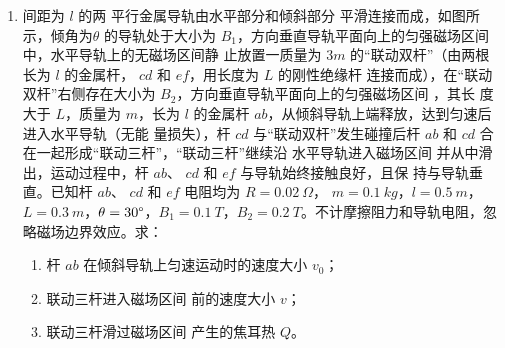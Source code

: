 \begin{enumerate}
\item 
{}
间距为 $ l $ 的两
平行金属导轨由水平部分和倾斜部分
平滑连接而成，如图所示，倾角为$ \theta $
的导轨处于大小为 $ B_{1} $，方向垂直导轨平面向上的匀强磁场区间  中，水平导轨上的无磁场区间静
止放置一质量为 $ 3m $ 的“联动双杆”（由两根长为 $ l $ 的金属杆， $ cd $ 和 $ ef $，用长度为 $ L $ 的刚性绝缘杆
连接而成），在“联动双杆”右侧存在大小为 $ B_{2} $，方向垂直导轨平面向上的匀强磁场区间  ，其长
度大于 $ L $，质量为 $ m $，长为 $ l $ 的金属杆 $ ab $，从倾斜导轨上端释放，达到匀速后进入水平导轨（无能
量损失），杆 $ cd $ 与“联动双杆”发生碰撞后杆 $ ab $ 和 $ cd $ 合在一起形成“联动三杆”，“联动三杆”继续沿
水平导轨进入磁场区间  并从中滑出，运动过程中，杆 $ ab $、 $ cd $ 和 $ ef $ 与导轨始终接触良好，且保
持与导轨垂直。已知杆 $ ab $、 $ cd $ 和 $ ef $ 电阻均为
$ R=0.02 \ \Omega $， $ m=0.1 \ kg $，$ l=0.5 \ m $，$ L=0.3 \ m $，$ \theta =30 \degree $，$ B_1=0.1 \ T $，$ B_2=0.2 \ T $。不计摩擦阻力和导轨电阻，忽
略磁场边界效应。求：
\begin{enumerate}
\item
杆 $ ab $ 在倾斜导轨上匀速运动时的速度大小 $ v_{0} $；
\item 
联动三杆进入磁场区间  前的速度大小 $ v $；
\item 
联动三杆滑过磁场区间  产生的焦耳热 $ Q $。


\end{enumerate}
\begin{figure}[h!]
\flushright

\end{figure}





\end{enumerate}
